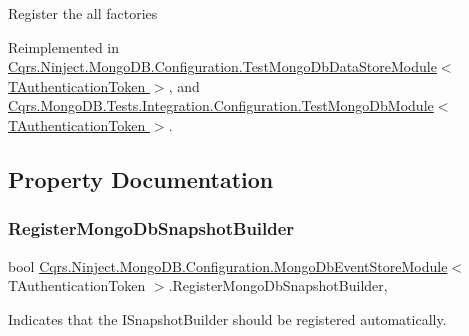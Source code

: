 Register the all factories 



Reimplemented in \hyperlink{classCqrs_1_1Ninject_1_1MongoDB_1_1Configuration_1_1TestMongoDbDataStoreModule_abff300412dc5c2602db5f51925204c6e_abff300412dc5c2602db5f51925204c6e}{Cqrs.\+Ninject.\+Mongo\+D\+B.\+Configuration.\+Test\+Mongo\+Db\+Data\+Store\+Module$<$ T\+Authentication\+Token $>$}, and \hyperlink{classCqrs_1_1MongoDB_1_1Tests_1_1Integration_1_1Configuration_1_1TestMongoDbModule_aa8a3a1f8c74becc8bb36008abe2c6e0f_aa8a3a1f8c74becc8bb36008abe2c6e0f}{Cqrs.\+Mongo\+D\+B.\+Tests.\+Integration.\+Configuration.\+Test\+Mongo\+Db\+Module$<$ T\+Authentication\+Token $>$}.



\subsection{Property Documentation}
\mbox{\label{classCqrs_1_1Ninject_1_1MongoDB_1_1Configuration_1_1MongoDbEventStoreModule_ad117a2cf21b462dade1055b4f15516bf_ad117a2cf21b462dade1055b4f15516bf}} 
\subsubsection{\texorpdfstring{Register\+Mongo\+Db\+Snapshot\+Builder}{RegisterMongoDbSnapshotBuilder}}
{\footnotesize\ttfamily bool \hyperlink{classCqrs_1_1Ninject_1_1MongoDB_1_1Configuration_1_1MongoDbEventStoreModule}{Cqrs.\+Ninject.\+Mongo\+D\+B.\+Configuration.\+Mongo\+Db\+Event\+Store\+Module}$<$ T\+Authentication\+Token $>$.Register\+Mongo\+Db\+Snapshot\+Builder\hspace{0.3cm}{\ttfamily [get]}, {\ttfamily [protected]}}



Indicates that the I\+Snapshot\+Builder should be registered automatically. 

